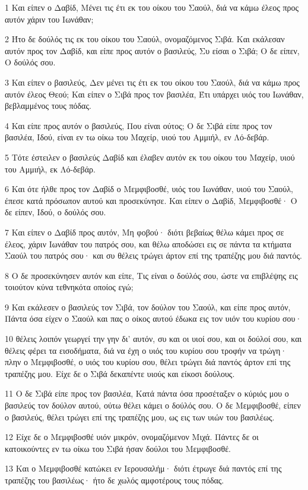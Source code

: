 \par 1 Και είπεν ο Δαβίδ, Μένει τις έτι εκ του οίκου του Σαούλ, διά να κάμω έλεος προς αυτόν χάριν του Ιωνάθαν;
\par 2 Ήτο δε δούλός τις εκ του οίκου του Σαούλ, ονομαζόμενος Σιβά. Και εκάλεσαν αυτόν προς τον Δαβίδ, και είπε προς αυτόν ο βασιλεύς, Συ είσαι ο Σιβά; Ο δε είπεν, Ο δούλός σου.
\par 3 Και είπεν ο βασιλεύς, Δεν μένει τις έτι εκ του οίκου του Σαούλ, διά να κάμω προς αυτόν έλεος Θεού; Και είπεν ο Σιβά προς τον βασιλέα, Έτι υπάρχει υιός του Ιωνάθαν, βεβλαμμένος τους πόδας.
\par 4 Και είπε προς αυτόν ο βασιλεύς, Που είναι ούτος; Ο δε Σιβά είπε προς τον βασιλέα, Ιδού, είναι εν τω οίκω του Μαχείρ, υιού του Αμμιήλ, εν Λό-δεβάρ.
\par 5 Τότε έστειλεν ο βασιλεύς Δαβίδ και έλαβεν αυτόν εκ του οίκου του Μαχείρ, υιού του Αμμιήλ, εκ Λό-δεβάρ.
\par 6 Και ότε ήλθε προς τον Δαβίδ ο Μεμφιβοσθέ, υιός του Ιωνάθαν, υιού του Σαούλ, έπεσε κατά πρόσωπον αυτού και προσεκύνησε. Και είπεν ο Δαβίδ, Μεμφιβοσθέ· Ο δε είπεν, Ιδού, ο δούλός σου.
\par 7 Και είπεν ο Δαβίδ προς αυτόν, Μη φοβού· διότι βεβαίως θέλω κάμει προς σε έλεος, χάριν Ιωνάθαν του πατρός σου, και θέλω αποδώσει εις σε πάντα τα κτήματα Σαούλ του πατρός σου· και συ θέλεις τρώγει άρτον επί της τραπέζης μου διά παντός.
\par 8 Ο δε προσεκύνησεν αυτόν και είπε, Τις είναι ο δούλός σου, ώστε να επιβλέψης εις τοιούτον κύνα τεθνηκότα οποίος εγώ;
\par 9 Και εκάλεσεν ο βασιλεύς τον Σιβά, τον δούλον του Σαούλ, και είπε προς αυτόν, Πάντα όσα είχεν ο Σαούλ και πας ο οίκος αυτού έδωκα εις τον υιόν του κυρίου σου·
\par 10 θέλεις λοιπόν γεωργεί την γην δι' αυτόν, συ και οι υιοί σου, και οι δούλοί σου, και θέλεις φέρει τα εισοδήματα, διά να έχη ο υιός του κυρίου σου τροφήν να τρώγη· πλην ο Μεμφιβοσθέ, ο υιός του κυρίου σου, θέλει τρώγει διά παντός άρτον επί της τραπέζης μου. Είχε δε ο Σιβά δεκαπέντε υιούς και είκοσι δούλους.
\par 11 Ο δε Σιβά είπε προς τον βασιλέα, Κατά πάντα όσα προσέταξεν ο κύριός μου ο βασιλεύς τον δούλον αυτού, ούτω θέλει κάμει ο δούλός σου. Ο δε Μεμφιβοσθέ, είπεν ο βασιλεύς, θέλει τρώγει επί της τραπέζης μου, ως εις των υιών του βασιλέως.
\par 12 Είχε δε ο Μεμφιβοσθέ υιόν μικρόν, ονομαζόμενον Μιχά. Πάντες δε οι κατοικούντες εν τω οίκω του Σιβά ήσαν δούλοι του Μεμφιβοσθέ.
\par 13 Και ο Μεμφιβοσθέ κατώκει εν Ιερουσαλήμ· διότι έτρωγε διά παντός επί της τραπέζης του βασιλέως· ήτο δε χωλός αμφοτέρους τους πόδας.

